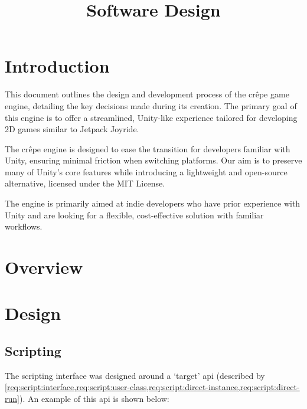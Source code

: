 \documentclass{projdoc}
\title{Software Design}
\begin{document}
\tablestables
\newpage

\section{Introduction}

This document outlines the design and development process of the cr\^epe game engine,
detailing the key decisions made during its creation. The primary goal of this engine
is to offer a streamlined, Unity-like experience tailored for developing 2D games
similar to Jetpack Joyride.

The cr\^epe engine is designed to ease the transition for developers familiar with
Unity, ensuring minimal friction when switching platforms. Our aim is to preserve
many of Unity’s core features while introducing a lightweight and open-source
alternative, licensed under the MIT License.

The engine is primarily aimed at indie developers who have prior experience with
Unity and are looking for a flexible, cost-effective solution with familiar
workflows.

\section{Overview}


\section{Design}



\subsection{Scripting}

The scripting interface was designed around a `target' \gls{api} (described by
\cref{req:script:interface,req:script:user-class,req:script:direct-instance,req:script:direct-run}).
An example of this \gls{api} is shown below:\noparbreak
\end{document}
